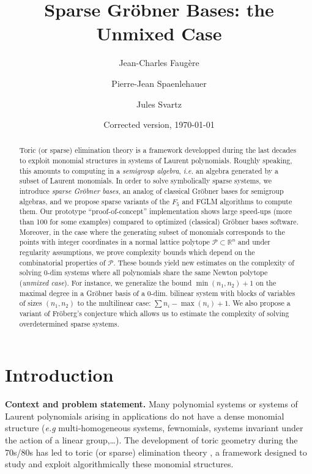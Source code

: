 \documentclass[12pt]{article}
\numberwithin{equation}{section}
\numberwithin{theorem}{section}
\newcommand{\polytope}{\mathscr P}
\newcommand{\R}{\mathbb{R}}
\begin{document}
\title{Sparse Gr\"obner Bases: the Unmixed Case}
\author[1,2,3,4]{Jean-Charles Faug\`ere}
\author[5,6,7,8]{Pierre-Jean Spaenlehauer}
\author[2,1,3,4]{\authorcr Jules Svartz}



\date{Corrected version, \today}

\maketitle
\begin{abstract}
  Toric (or sparse) elimination theory is a framework developped
  during the last decades to exploit monomial structures in
  systems of Laurent polynomials. Roughly speaking, this amounts to computing in a \emph{semigroup algebra}, \emph{i.e.} an
  algebra generated by a subset of Laurent monomials.  In order to solve symbolically sparse systems, we introduce
  \emph{sparse Gr\"obner bases}, an analog of classical Gr\"obner
  bases for semigroup algebras, and we propose sparse variants of the
  $F_5$ and FGLM algorithms to compute them.  Our prototype
  ``proof-of-concept'' implementation shows large speed-ups
  (more than 100 for some examples) compared to optimized (classical)
  Gr\"obner bases software.  Moreover, in the case where the
  generating subset of monomials corresponds to the points with integer coordinates in a
  normal lattice polytope $\polytope\subset\R^n$ and under regularity
  assumptions, we prove complexity bounds which
  depend on the combinatorial properties of $\polytope$. These bounds
  yield new estimates on the complexity of solving $0$-dim systems
  where all polynomials share the same Newton polytope (\emph{unmixed case}).
  For instance, we generalize the bound $\min(n_1,n_2)+1$ on
  the maximal degree in a Gr\"obner basis of a $0$-dim. bilinear
  system with blocks of variables of sizes $(n_1,n_2)$ to the
  multilinear case: $\sum n_i - \max(n_i)+1$. We also propose a
  variant of Fr\"oberg's conjecture which allows us to estimate the
  complexity of solving overdetermined sparse systems.
\end{abstract}

\section{Introduction} {\bf Context and problem statement.} Many
polynomial systems or systems of Laurent polynomials arising in
applications do not have a dense monomial structure (\emph{e.g}
multi-homogeneous systems, fewnomials, systems invariant under the action of a linear
group,\ldots). The development of
toric geometry during the 70s/80s has led to toric (or
sparse) elimination theory \cite{Stu91}, a framework designed to
study and exploit algorithmically these monomial structures.
\end{document}
